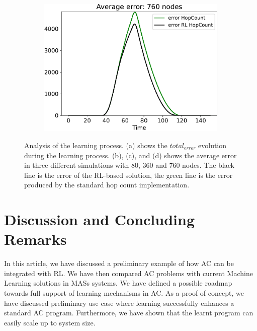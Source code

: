 \documentclass[conference]{IEEEtran}
\newcommand{\todos}[1]{\todo[inline, color=cyan]{\textbf{TODO}: #1}}
\begin{document}
\begin{figure}
\begin{subfigure}[b]{0.3\textwidth}
      \includegraphics[width=\textwidth]{img/760}
      \caption{}
      \label{fig:simulation-d}
  \end{subfigure}
  \caption{Analysis of the learning process. (a) shows the $total_{error}$ evolution during the learning process. (b), (c), and (d) shows the average error in three different simulations with 80, 360 and 760 nodes. 
  The black line is the error of the RL-based solution, 
  the green line is the error produced by the standard hop count implementation.}
  \label{fig:simulation}
\end{figure}

\section{Discussion and Concluding Remarks}\label{conclusion}
In this article, we have discussed a preliminary example of how AC can be integrated with RL. 
We have then compared AC problems with current Machine Learning solutions in MASs systems.
%
We have defined a possible roadmap towards full support of learning mechanisms in AC. %
As a proof of concept, we have discussed preliminary use case where 
 learning successfully enhances a standard AC program.
Furthermore, we have shown that the learnt program can easily scale up to system size.
\end{document}
